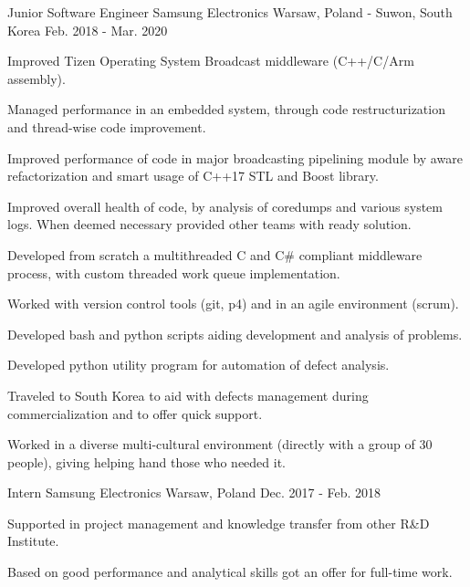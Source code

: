 \begin{cventries}
  \cventry
    {Junior Software Engineer} %
    {Samsung Electronics} %
    {Warsaw, Poland - Suwon, South Korea} %
    {Feb. 2018 - Mar. 2020} %
    {
      \begin{cvitems} %
        \item { Improved Tizen Operating System Broadcast middleware (C++/C/Arm assembly). }
        \item { Managed performance in an embedded system, through code restructurization and thread-wise code improvement.}
        \item { Improved performance of code in major broadcasting pipelining module by aware refactorization and smart usage of C++17 STL and Boost library.}
        \item { Improved overall health of code, by analysis of coredumps and various system logs. When deemed necessary provided other teams with ready solution.}
        \item { Developed from scratch a multithreaded C and C# compliant middleware process, with custom threaded work queue implementation.}
        \item { Worked with version control tools (git, p4) and in an agile environment (scrum).}
        \item { Developed bash and python scripts aiding development and analysis of problems.}
        \item { Developed python utility program for automation of defect analysis.}
        \item { Traveled to South Korea to aid with defects management during commercialization and to offer quick support.}
        \item { Worked in a diverse multi-cultural environment (directly with a group of 30 people), giving helping hand those who needed it.}
      \end{cvitems}
    }

  \cventry
    {Intern} %
    {Samsung Electronics} %
    {Warsaw, Poland} %
    {Dec. 2017 - Feb. 2018} %
    {
      \begin{cvitems} %
        \item { Supported in project management and knowledge transfer from other R\&D Institute.}
        \item { Based on good performance and analytical skills got an offer for full-time work.}
      \end{cvitems}
    }


\end{cventries}
